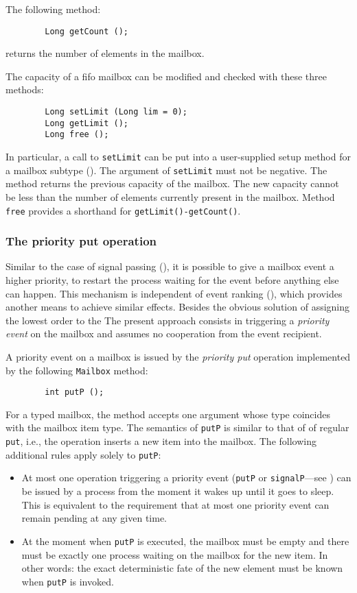 \medskip

\noindent
The following method:
\begin{verbatim}
        Long getCount ();
\end{verbatim}
returns the number of elements in the mailbox.

The capacity of a fifo
mailbox can be modified and checked with these three methods:
\begin{verbatim}
        Long setLimit (Long lim = 0);
        Long getLimit ();
        Long free ();
\end{verbatim}
In particular, a call to {\tt setLimit} can be put into a user-supplied
setup method for a mailbox subtype ().
The argument of {\tt setLimit} must not be negative.
The method returns the previous capacity of the mailbox.
The new capacity cannot be less than the number of elements currently
present in the mailbox.
Method {\tt free} provides a shorthand for {\tt getLimit()-getCount()}.

\subsubsection{The priority put operation}
\label{rm_mb_fi_pp}

Similar to the case of signal passing (), it is
possible to give a mailbox event
a higher priority, to restart the process waiting for the event
before anything else can happen.
This mechanism is independent of event ranking (), which
provides another means to achieve similar effects.
Besides the obvious solution of assigning the lowest order to the
The present approach consists in triggering a
{\em priority event\/} on the mailbox and
assumes no cooperation from the event recipient.

A priority event on a mailbox is issued by the {\em priority put\/}
operation implemented by the following {\tt Mailbox} method:
\begin{verbatim}
        int putP ();
\end{verbatim}
For a typed mailbox, the method accepts one argument whose type coincides with
the mailbox item type.
The semantics of {\tt putP} is
similar to that of of regular {\tt put}, i.e.,
the operation inserts a new item into the mailbox.
The following additional rules apply solely to {\tt putP}:
\begin{itemize}
\item
At most one operation triggering a priority event ({\tt putP} or
{\tt signalP}---see )
can be issued by a process from the moment
it wakes up until it goes to sleep.
This is equivalent to the requirement that
at most one priority event can remain pending at any given time.
\item
At the moment when {\tt putP} is executed, the mailbox must be empty and
there must be exactly one process waiting on the mailbox for the new item.
In other words: the exact deterministic
fate of the new element must be known when {\tt putP} is invoked.
\end{itemize}

